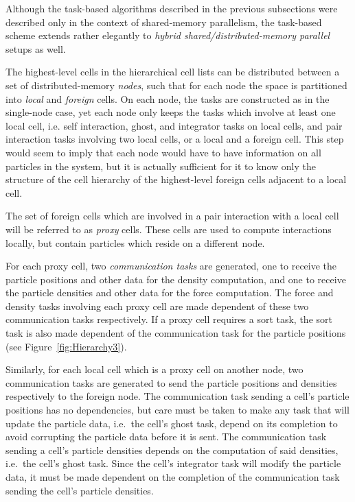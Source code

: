 \documentclass[final]{siamltex}
\newcommand{\fig}[1]
    {Figure~\ref{fig:#1}}
\begin{document}
Although the task-based algorithms described in the previous subsections
were described only in the context of shared-memory parallelism,
the task-based scheme
extends rather elegantly to {\em hybrid shared/distributed-memory
parallel} setups as well.

The highest-level cells in the hierarchical cell lists can be distributed
between a set of distributed-memory {\em nodes}, such that for each
node the space is partitioned into {\em local} and {\em foreign} cells.
On each node, the tasks are constructed as in the single-node
case, yet each node only keeps the tasks which involve at
least one local cell, i.e. self interaction, ghost, and integrator
tasks on local cells, and pair interaction tasks involving two
local cells, or a local and a foreign cell.
This step would seem to imply that each node would have to have
information on all particles in the system, but it is actually
sufficient for it to know only the structure of the cell hierarchy
of the highest-level foreign cells adjacent to a local cell.

The set of foreign cells which are involved in a pair interaction
with a local cell will be referred to as {\em proxy} cells.
These cells are used to compute interactions locally, but contain
particles which reside on a different node.

For each proxy cell, two {\em communication tasks} are generated, one
to receive the particle positions and other data for the density
computation, and one to receive the particle densities and other
data for the force computation.
The force and density tasks involving each proxy cell are
made dependent of these two communication tasks respectively.
If a proxy cell requires a sort task, the sort task is also made
dependent of the communication task for the particle positions
(see \fig{Hierarchy3}).

Similarly, for each local cell which is a proxy cell on another
node, two communication tasks are generated to send the
particle positions and densities respectively to the foreign node.
The communication task sending a cell's particle positions has
no dependencies, but care must be taken to make any task that
will update the particle data, i.e.~the cell's ghost task, depend
on its completion to avoid corrupting the particle data before
it is sent.
The communication task sending a cell's particle densities depends
on the computation of said densities, i.e.~the cell's ghost task.
Since the cell's integrator task will modify the particle data, it must
be made dependent on the completion of the communication task sending
the cell's particle densities.
\end{document}

